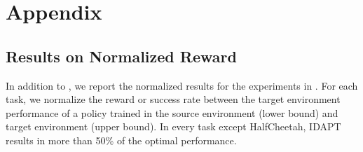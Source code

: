 \appendix
\section{Appendix}

\subsection{Results on Normalized Reward}

In addition to , we report the normalized results for the experiments in .  For each task, we normalize the reward or success rate between the target environment performance of a policy trained in the source environment (lower bound) and target environment (upper bound).  In every task except HalfCheetah, IDAPT results in more than 50\% of the optimal performance.


